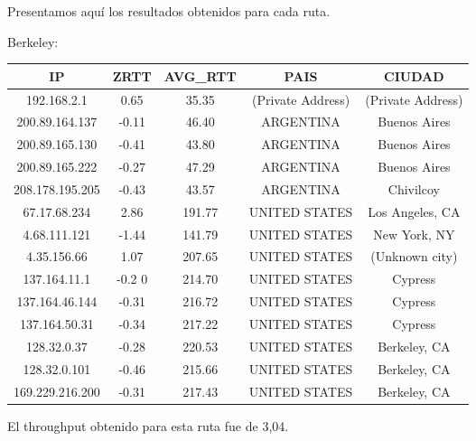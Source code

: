 Presentamos aquí los resultados obtenidos para cada ruta.

Berkeley:

\begin{tabular}{|c@{\hspace{5ex}}c@{\hspace{5ex}}c@{\hspace{5ex}}c@{\hspace{5ex}}c|}
 \hline
 \rule{0pt}{1.2em}IP & ZRTT & AVG\_RTT & PAIS & CIUDAD\\[0.2em]
 \hline

\rule{0pt}{1.2em} 192.168.2.1  &  0.65 & 35.35 & (Private Address) & (Private Address) \\[0.2em]
\rule{0pt}{1.2em} 200.89.164.137  &  -0.11 & 46.40 & ARGENTINA & Buenos Aires \\[0.2em]
\rule{0pt}{1.2em} 200.89.165.130  &  -0.41 & 43.80 & ARGENTINA & Buenos Aires \\[0.2em]
\rule{0pt}{1.2em} 200.89.165.222  &  -0.27 & 47.29 & ARGENTINA & Buenos Aires \\[0.2em]
\rule{0pt}{1.2em} 208.178.195.205  &  -0.43 & 43.57 & ARGENTINA & Chivilcoy \\[0.2em]
\rule{0pt}{1.2em} 67.17.68.234  &  2.86 & 191.77 & UNITED STATES & Los Angeles, CA \\[0.2em]
\rule{0pt}{1.2em} 4.68.111.121  &  -1.44 & 141.79 & UNITED STATES & New York, NY \\[0.2em]
\rule{0pt}{1.2em} 4.35.156.66  &  1.07 & 207.65 & UNITED STATES & (Unknown city) \\[0.2em]
\rule{0pt}{1.2em} 137.164.11.1  &  -0.2 0& 214.70 & UNITED STATES & Cypress \\[0.2em]
\rule{0pt}{1.2em} 137.164.46.144  &  -0.31 & 216.72 & UNITED STATES & Cypress \\[0.2em]
\rule{0pt}{1.2em} 137.164.50.31  &  -0.34 & 217.22 & UNITED STATES & Cypress \\[0.2em]
\rule{0pt}{1.2em} 128.32.0.37  &  -0.28 & 220.53 & UNITED STATES & Berkeley, CA \\[0.2em]
\rule{0pt}{1.2em} 128.32.0.101  &  -0.46 & 215.66 & UNITED STATES & Berkeley, CA \\[0.2em]
\rule{0pt}{1.2em} 169.229.216.200  &  -0.31 & 217.43 & UNITED STATES & Berkeley, CA \\[0.2em]
\hline
 \end{tabular}

El throughput obtenido para esta ruta fue de 3,04.

